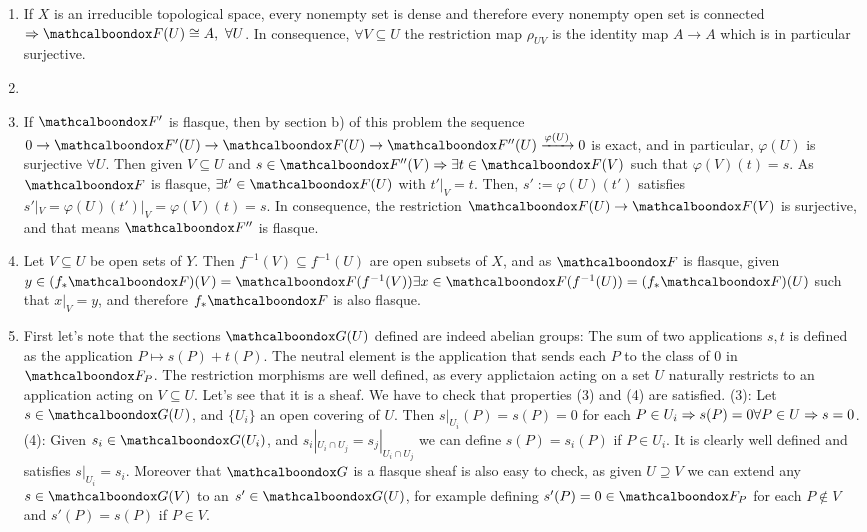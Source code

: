 \begin{sol}
	\begin{enumerate}[label=\alph*)]
		\item If $X$ is an irreducible topological space, every nonempty set is dense and therefore every nonempty open set is connected $\imp \sF(U) \cong A, \, \, \forall U$. In consequence, $\forall V \subseteq U$ the restriction map $\rho_{UV}$ is the identity map $A \to A$ which is in particular surjective.

		\item %

		\item If $\sF'$ is flasque, then by section b) of this problem the sequence $0 \to \sF'(U) \to \sF(U) \to \sF''(U) \xrightarrow[]{\varphi(U)} 0$ is exact, and in particular, $\varphi(U)$ is surjective $\forall U$. Then given $V \subseteq U$ and $s \in \sF''(V) \imp \exists t \in \sF(V)$ such that $\varphi(V)(t) = s$. As $\sF$ is flasque, $\exists t' \in \sF(U)$ with $t'|_V = t$. Then, $s':= \varphi(U)(t')$ satisfies $s'|_{V} = \varphi(U)(t')|_V = \varphi(V)(t) = s$. In consequence, the restriction $\sF(U) \to \sF(V)$ is surjective, and that means $\sF''$ is flasque.

		\item Let $V \subseteq U$ be open sets of $Y$. Then $f^{-1}(V) \subseteq f^{-1}(U)$ are open subsets of $X$, and as $\sF$ is flasque, given $y \in (f_{*}\sF)(V) = \sF(f^{-1}(V)) \exists x \in \sF(f^{-1}(U)) = (f_{*}\sF)(U)$ such that $x|_V = y$, and therefore $f_{*}\sF$ is also flasque.

		\item First let's note that the sections $\sG(U)$ defined are indeed abelian groups: The sum of two applications $s,t$ is defined as the application $P \mapsto s(P) + t(P)$. The neutral element is the application that sends each $P$ to the class of 0 in $\sF_P$. The restriction morphisms are well defined, as every applictaion acting on a set $U$ naturally restricts to an application acting on $V \subseteq U$. Let's see that it is a sheaf. We have to check that properties (3) and (4) are satisfied. (3): Let $s \in \sG(U)$, and $\{U_i\}$ an open covering of $U$. Then $s|_{U_i}(P) = s(P) = 0$ for each $P \in U_i \Rightarrow s(P) = 0 \forall P \in U \Rightarrow s = 0$. (4): Given $s_i \in \sG(U_i)$, and $s_i|_{U_i \cap U_j} = s_j|_{U_i \cap U_j} $ we can define $s(P) = s_i(P)$ if $P \in U_i$. It is clearly well defined and satisfies $s|_{U_i} = s_i$.
		Moreover that $\sG$ is a flasque sheaf is also easy to check, as given $U \supseteq V$ we can extend any $s \in \sG(V)$ to an $s' \in \sG(U)$, for example defining $s'(P) = 0 \in \sF_P$ for each $P \notin V$ and $s'(P) = s(P)$ if $P \in V$.


\end{enumerate}
\end{sol}
